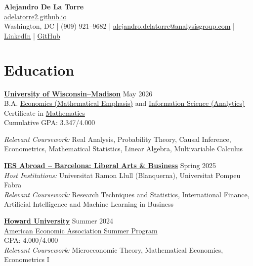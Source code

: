 \documentclass[10.5pt]{article} %
\begin{document}
\begin{center}
    {\Large \textbf{Alejandro De La Torre}} \\ 
    \href{https://adelatorre2.github.io}{adelatorre2.github.io} \\
    Washington, DC \;|\; (909) 921--9682 \;|\; 
    \href{mailto:alejandro.delatorre@analysisgroup.com}{alejandro.delatorre@analysisgroup.com} \;|\; 
    \href{https://www.linkedin.com/in/adelatorre2/}{LinkedIn} \;|\; 
    \href{https://github.com/adelatorre2}{GitHub}
\end{center}

\section*{Education}

\textbf{\href{https://www.wisc.edu/}{University of Wisconsin--Madison}} \hfill May 2026 \\
\hspace{0.5em}
B.A. \href{https://econ.wisc.edu/}{Economics (Mathematical Emphasis)} and \href{https://ischool.wisc.edu/}{Information Science (Analytics)} \\
Certificate in \href{https://math.wisc.edu/}{Mathematics} \\
Cumulative GPA: 3.347/4.000

\vspace{2pt}
\noindent\textit{Relevant Coursework:}
Real Analysis, Probability Theory, Causal Inference, Econometrics,
Mathematical Statistics, Linear Algebra, Multivariable Calculus

\vspace{6pt}
\noindent\textbf{\href{https://www.iesabroad.org/programs/barcelona-liberal-arts-business}{IES Abroad -- Barcelona: Liberal Arts \& Business}} \hfill Spring 2025 \\
\textit{Host Institutions:} Universitat Ramon Llull (Blanquerna), Universitat Pompeu Fabra \\
\textit{Relevant Coursework:} Research Techniques and Statistics, International Finance, Artificial Intelligence and Machine Learning in Business

\vspace{6pt} %

\noindent\textbf{\href{https://economics.howard.edu/articles/aeasp-2024-scholar-alejandro-de-la-torre}{Howard University}} \hfill Summer 2024 \\
\href{https://www.aeaweb.org/about-aea/committees/aeasp}{American Economic Association Summer Program} \\
GPA: 4.000/4.000 \\
\textit{Relevant Coursework:} Microeconomic Theory, Mathematical Economics, Econometrics I
\end{document}
